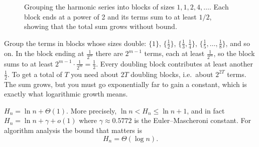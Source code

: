 \begin{intuitionbox}
\begin{figure}[H]
\centering
{}
\caption{Grouping the harmonic series into blocks of sizes $1, 1, 2, 4, \dots$. Each block ends at a power of 2 and its terms sum to at least $1/2$, showing that the total sum grows without bound.}
\label{ch37:fig-harmonic-blocks}
\end{figure}

Group the terms in blocks whose sizes double: $\{1\}$, $\{\tfrac12\}$,
$\{\tfrac13,\tfrac14\}$, $\{\tfrac15,\dots,\tfrac18\}$, and so on. In the block
ending at $\tfrac{1}{2^m}$ there are $2^{m-1}$ terms, each at least
$\tfrac{1}{2^m}$, so the block sums to at least $2^{m-1}\cdot\tfrac{1}{2^m} =
\tfrac12$. Every doubling block contributes at least another $\tfrac12$. To get a
total of $T$ you need about $2T$ doubling blocks, i.e.\ about $2^{2T}$ terms. The
sum grows, but you must go exponentially far to gain a constant, which is
exactly what logarithmic growth means.
\end{intuitionbox}

\begin{theorem}
\label{ch37:thm-harmonic}
$H_n = \ln n + \Theta(1)$. More precisely, $\ln n < H_n \le \ln n + 1$, and in
fact $H_n = \ln n + \gamma + o(1)$ where $\gamma \approx 0.5772$ is the
Euler--Mascheroni constant. For algorithm analysis the bound that matters is
\[
  H_n = \Theta(\log n).
\]
\end{theorem}

